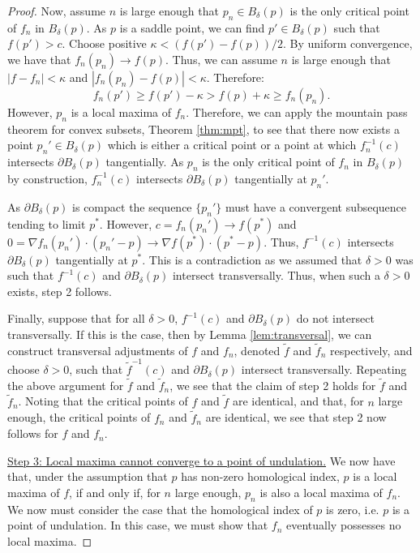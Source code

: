 \documentclass[11pt]{article}
\newcommand{\1}{\mathbf{1}}
\theoremstyle{definition}
\theoremstyle{remark}
\begin{document}
\begin{proof}
    Now, assume $n$ is large enough that $p_n\in B_\delta(p)$ is the only critical point of $f_n$ in $B_\delta(p)$. As $p$ is a saddle point, we can find $p'\in B_\delta(p)$ such that $f(p')>c$. Choose positive $\kappa < (f(p')-f(p))/2$. By uniform convergence, we have that $f_n(p_n)\rightarrow f(p)$. Thus, we can assume $n$ is large enough that $|f-f_n|<\kappa$ and $|f_n(p_n)-f(p)|<\kappa$. Therefore:
    \begin{equation}\nonumber
        f_n(p')\geq f(p')-\kappa > f(p)+\kappa \geq f_n(p_n).
    \end{equation}
    However, $p_n$ is a local maxima of $f_n$. Therefore, we can apply the mountain pass theorem for convex subsets, Theorem \ref{thm:mpt}, to see that there now exists a point $p_n' \in B_\delta(p)$ which is either a critical point or a point at which $f_n^{-1}(c)$ intersects $\partial B_\delta(p)$ tangentially. As $p_n$ is the only critical point of $f_n$ in $B_\delta(p)$ by construction, $f_n^{-1}(c)$ intersects $\partial B_\delta(p)$ tangentially at $p_n'$. 
    
    As $\partial B_\delta(p)$ is compact the sequence $\{p_n'\}$ must have a convergent subsequence tending to limit $p^*$. However, $c=f_n(p_n')\rightarrow f(p^*)$ and $0=\nabla f_n(p_n')\cdot (p_n'-p)\rightarrow \nabla f(p^*)\cdot (p^*-p)$. Thus, $f^{-1}(c)$ intersects $\partial B_\delta(p)$ tangentially at $p^*$. This is a contradiction as we assumed that $\delta>0$ was such that $f^{-1}(c)$ and $\partial B_\delta(p)$ intersect transversally. Thus, when such a $\delta >0$ exists, step 2 follows.

    Finally, suppose that for all $\delta>0$, $f^{-1}(c)$ and $\partial B_\delta(p)$ do not intersect transversally. If this is the case, then by Lemma \ref{lem:transversal}, we can construct transversal adjustments of $f$ and $f_n$, denoted $\tilde{f}$ and $\tilde{f}_n$ respectively, and choose $\delta>0$, such that $\tilde{f}^{-1}(c)$ and $\partial B_\delta(p)$ intersect transversally. Repeating the above argument for $\tilde{f}$ and $\tilde{f}_n$, we see that the claim of step 2 holds for $\tilde{f}$ and $\tilde{f}_n$. Noting that the critical points of $f$ and $\tilde{f}$ are identical, and that, for $n$ large enough, the critical points of $f_n$ and $\tilde{f}_n$ are identical, we see that step 2 now follows for $f$ and $f_n$.

    
    \underline{Step 3: Local maxima cannot converge to a point of undulation.} We now have that, under the assumption that $p$ has non-zero homological index, $p$ is a local maxima of $f$, if and only if, for $n$ large enough, $p_n$ is also a local maxima of $f_n$. We now must consider the case that the homological index of $p$ is zero, i.e. $p$ is a point of undulation. In this case, we must show that $f_n$ eventually possesses no local maxima.
    

\end{proof}
\end{document}

